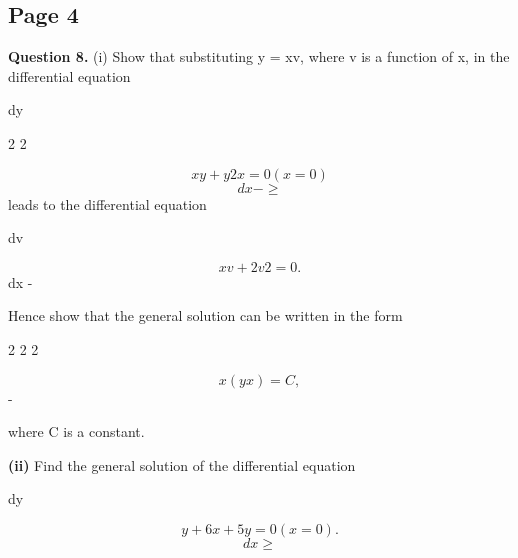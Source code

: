 \documentclass[12pt]{article}
\begin{document}
\subsection*{Page 4}
\begin{flushleft}
\omega\par
\bigskip\textbf{Question 8.} (i) Show that substituting y = xv, where v is a function of x, in the differential equation\par
dy\par
2 2\par
\[xy + y 2x = 0 (x = 0)\]
\[dx - \geq\]
leads to the differential equation\par
dv\par
\[xv + 2v 2 = 0 .\]
dx -\par
Hence show that the general solution can be written in the form\par
2 2 2\par
\[x (y x ) = C ,\]
-\par
where C is a constant.\par
\textbf{(ii)} Find the general solution of the differential equation\par
dy\par
\[y + 6x + 5y = 0 (x = 0).\]
\[dx \geq\]
\end{flushleft}
\end{document}
